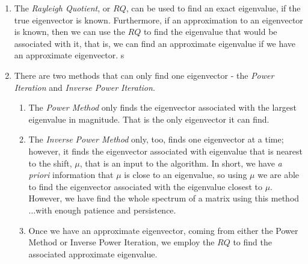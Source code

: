 \documentclass[paper=a4, fontsize=11pt]{scrartcl} %
\numberwithin{equation}{section} %
\numberwithin{figure}{section} %
\numberwithin{table}{section} %
\begin{document}
\begin{enumerate}

\item The \emph{Rayleigh Quotient}, or $RQ$, can be used to find an exact eigenvalue, if the true eigenvector is known. Furthermore, if an approximation to an eigenvector is known, then we can use the $RQ$ to find the eigenvalue that would be associated with it, that is, we can find an approximate eigenvalue if we have an approximate eigenvector. s

\item There are two methods that can only find one eigenvector - the \emph{Power Iteration} and \emph{Inverse Power Iteration}.
\begin{enumerate}
\item The \emph{Power Method} only finds the eigenvector associated with the largest eigenvalue in magnitude. That is the only eigenvector it can find. 
\item The \emph{Inverse Power Method} only, too, finds one eigenvector at a time; however, it finds the eigenvector associated with eigenvalue that is nearest to the shift, $\mu$, that is an input to the algorithm. In short, we have \emph{a priori} information that $\mu$ is close to an eigenvalue, so using $\mu$ we are able to find the eigenvector associated with the eigenvalue closest to $\mu$. However, we have find the whole spectrum of a matrix using this method$\ldots$with enough patience and persistence. 
\item Once we have an approximate eigenvector, coming from either the Power Method or Inverse Power Iteration, we employ  the $RQ$ to find the associated approximate eigenvalue.
\end{enumerate}


\end{enumerate}
\end{document}
